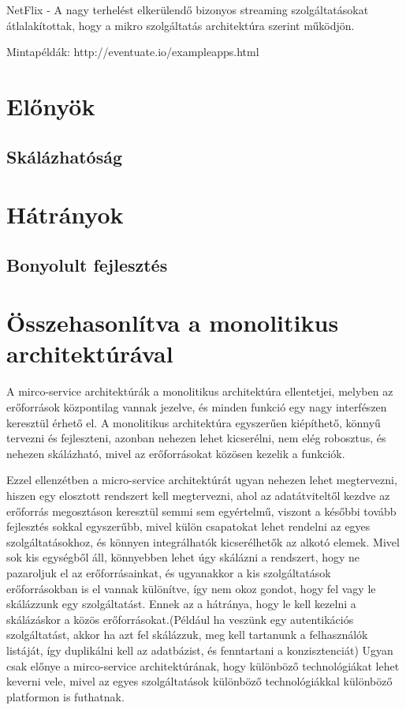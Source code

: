\documentclass[11pt,magyar,a4paper,oneside,]{report}
\begin{document}
NetFlix - A nagy terhelést elkerülendő bizonyos streaming
szolgáltatásokat átlalakítottak, hogy a mikro szolgáltatás architektúra
szerint működjön.

Mintapéldák: http://eventuate.io/exampleapps.html

\chapter{Előnyök}\label{elux151nyuxf6k}

\section{Skálázhatóság}\label{skuxe1luxe1zhatuxf3suxe1g}

\chapter{Hátrányok}\label{huxe1truxe1nyok}

\section{Bonyolult fejlesztés}\label{bonyolult-fejlesztuxe9s}

\chapter{Összehasonlítva a monolitikus
architektúrával}\label{uxf6sszehasonluxedtva-a-monolitikus-architektuxfaruxe1val}

A mirco-service architektúrák a monolitikus architektúra ellentetjei,
melyben az erőforrások központilag vannak jezelve, és minden funkció egy
nagy interfészen keresztül érhető el. A monolitikus architektúra
egyszerűen kiépíthető, könnyű tervezni és fejleszteni, azonban nehezen
lehet kicserélni, nem elég robosztus, és nehezen skálázható, mivel az
erőforrásokat közösen kezelik a funkciók.

Ezzel ellenzétben a micro-service architektúrát ugyan nehezen lehet
megtervezni, hiszen egy elosztott rendszert kell megtervezni, ahol az
adatátviteltől kezdve az erőforrás megosztáson keresztül semmi sem
egyértelmű, viszont a későbbi tovább fejlesztés sokkal egyszerűbb, mivel
külön csapatokat lehet rendelni az egyes szolgáltatásokhoz, és könnyen
integrálhatók kicserélhetők az alkotó elemek. Mivel sok kis egységből
áll, könnyebben lehet úgy skálázni a rendszert, hogy ne pazaroljuk el az
erőforrásainkat, és ugyanakkor a kis szolgáltatások erőforrásokban is el
vannak különítve, így nem okoz gondot, hogy fel vagy le skálázzunk egy
szolgáltatást. Ennek az a hátránya, hogy le kell kezelni a skálázáskor a
közös erőforrásokat.(Például ha veszünk egy autentikációs szolgáltatást,
akkor ha azt fel skálázzuk, meg kell tartanunk a felhasználók listáját,
így duplikálni kell az adatbázist, és fenntartani a konzisztenciát)
Ugyan csak előnye a mirco-service architektúrának, hogy különböző
technológiákat lehet keverni vele, mivel az egyes szolgáltatások
különböző technológiákkal különböző platformon is futhatnak.
\end{document}
